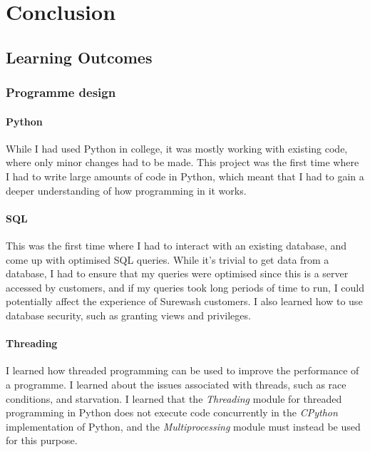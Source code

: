 
\section{Conclusion}
    \subsection{Learning Outcomes}
        \subsubsection{Programme design}
            \paragraph{Python}
            While I had used Python in college, it was mostly working with existing code, where only minor changes had to be made. This project was the first time where I had to write large amounts of code in Python, which meant that I had to gain a deeper understanding of how programming in it works.
            \paragraph{SQL}
            This was the first time where I had to interact with an existing database, and come up with optimised SQL queries. While it's trivial to get data from a database, I had to ensure that my queries were optimised since this is a server accessed by customers, and if my queries took long periods of time to run, I could potentially affect the experience of Surewash customers. I also learned how to use database security, such as granting views and privileges.
            \paragraph{Threading}
            I learned how threaded programming can be used to improve the performance of a programme. I learned about the issues associated with threads, such as race conditions, and starvation. I learned that the {\slshape Threading} module for threaded programming in Python does not execute code concurrently in the {\slshape CPython} implementation of Python, and the {\slshape Multiprocessing} module must instead be used for this purpose.
